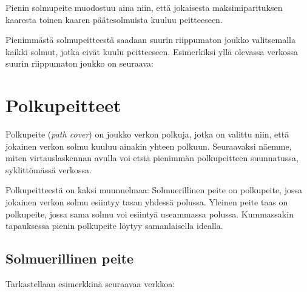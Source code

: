 Pienin solmupeite muodostuu aina niin,
että jokaisesta maksimiparituksen kaaresta
toinen kaaren päätesolmuista kuuluu peitteeseen.

Pienimmästä solmupeitteestä saadaan suurin
riippumaton joukko valitsemalla
kaikki solmut, jotka eivät kuulu peitteeseen.
Esimerkiksi yllä olevassa verkossa
suurin riippumaton joukko on seuraava:

\begin{center}
\end{center}

\section{Polkupeitteet}

Polkupeite (\textit{path cover}) on joukko verkon polkuja,
jotka on valittu niin, että jokainen verkon solmu kuuluu
ainakin yhteen polkuun. Seuraavaksi näemme, miten virtauslaskennan
avulla voi etsiä pienimmän polkupeitteen suunnatussa,
syklittömässä verkossa.

Polkupeitteestä on kaksi muunnelmaa:
Solmuerillinen peite on polkupeite,
jossa jokainen verkon solmu esiintyy tasan yhdessä polussa.
Yleinen peite taas on polkupeite, jossa sama solmu voi
esiintyä useammassa polussa.
Kummassakin tapauksessa pienin polkupeite löytyy
samanlaisella idealla.

\subsection{Solmuerillinen peite}

Tarkastellaan esimerkkinä seuraavaa verkkoa:

\begin{center}
\end{center}

